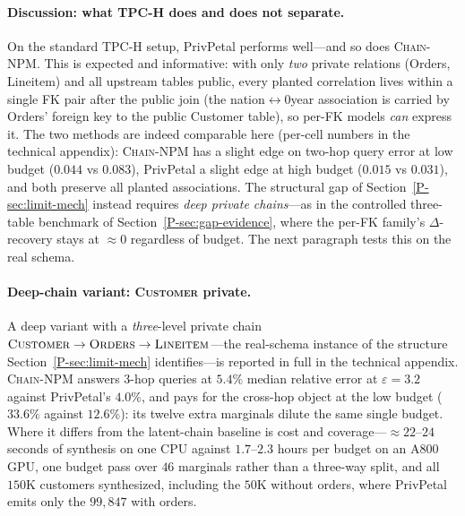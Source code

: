 \documentclass[sigconf, nonacm]{acmart}
\newcommand{\chainnpm}{\textsc{Chain-NPM}\xspace}
\begin{document}
\paragraph{Discussion: what TPC-H does and does not separate.}
On the standard TPC-H setup, PrivPetal performs well---and so does
\chainnpm. This is expected and informative: with only \emph{two} private
relations (Orders, Lineitem) and all upstream tables public, every planted
correlation lives within a single FK pair after the public join (the
nation$\leftrightarrow$\penalty0year association is carried by Orders' foreign key to
the public Customer table), so per-FK models \emph{can} express it. The two
methods are indeed comparable here (per-cell numbers in the
technical appendix): \chainnpm has a
slight edge on two-hop
query error at low budget ($0.044$ vs $0.083$), PrivPetal a slight edge at
high budget ($0.015$ vs $0.031$), and both preserve all planted
associations. The structural gap of Section~\ref{P-sec:limit-mech} instead requires
\emph{deep private chains}---as in the controlled three-table benchmark of
Section~\ref{P-sec:gap-evidence}, where the per-FK family's $\Delta$-recovery
stays at $\approx 0$ regardless of budget. The next paragraph tests this on
the real schema.

\paragraph{Deep-chain variant: \textsc{Customer} private.}
A deep variant with a \emph{three}-level private chain
$\textsc{Customer}\to\textsc{Orders}\to\textsc{Lineitem}$---the real-schema
instance of the structure Section~\ref{P-sec:limit-mech} identifies---is
reported in full in the technical appendix. \chainnpm answers $3$-hop
queries at $5.4\%$ median relative error at $\varepsilon{=}3.2$ against
PrivPetal's $4.0\%$, and pays for the cross-hop object at the low budget
($33.6\%$ against $12.6\%$): its twelve extra marginals dilute the same
single budget. Where it differs from the latent-chain baseline is cost and
coverage---$\approx 22$--$24$ seconds of synthesis on one CPU against
$1.7$--$2.3$ hours per budget on an A800 GPU, one budget pass over $46$
marginals rather than a three-way split, and all $150$K customers
synthesized, including the $50$K without orders, where PrivPetal emits only
the $99{,}847$ with orders.
\end{document}
